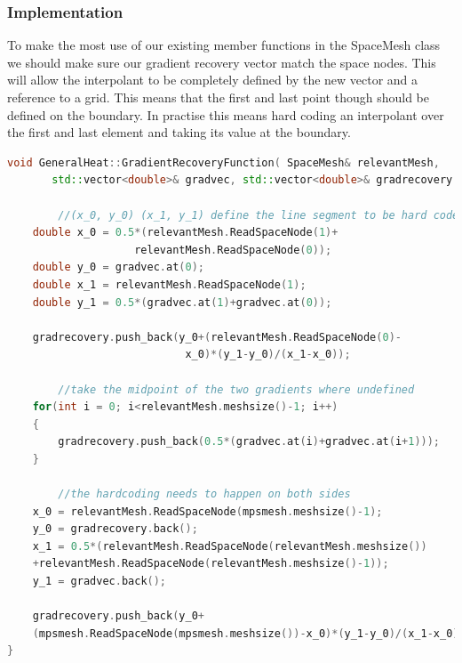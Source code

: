 \documentclass{uonmathreport}
\theoremstyle{definition}
\theoremstyle{problem}
\theoremstyle{theorem}
\begin{document}
\begin{center}
\end{center}

\subsubsection{Implementation} \label{subsubsec:KK Implementation}

To make the most use of our existing member functions in the SpaceMesh class we should make sure our gradient recovery vector match the space nodes. This will allow the interpolant to be completely defined by the new vector and a reference to a grid. This means that the first and last point though should be defined on the boundary. In practise this means hard coding an interpolant over the first and last element and taking its value at the boundary.

\begin{lstlisting}[language=C++]
void GeneralHeat::GradientRecoveryFunction( SpaceMesh& relevantMesh,
       std::vector<double>& gradvec, std::vector<double>& gradrecovery ) {
    	
    	//(x_0, y_0) (x_1, y_1) define the line segment to be hard coded
    double x_0 = 0.5*(relevantMesh.ReadSpaceNode(1)+
    				relevantMesh.ReadSpaceNode(0));
    double y_0 = gradvec.at(0);
    double x_1 = relevantMesh.ReadSpaceNode(1);
    double y_1 = 0.5*(gradvec.at(1)+gradvec.at(0));

    gradrecovery.push_back(y_0+(relevantMesh.ReadSpaceNode(0)-
    						x_0)*(y_1-y_0)/(x_1-x_0));
		
		//take the midpoint of the two gradients where undefined
    for(int i = 0; i<relevantMesh.meshsize()-1; i++)
    {
        gradrecovery.push_back(0.5*(gradvec.at(i)+gradvec.at(i+1)));
    }
		
		//the hardcoding needs to happen on both sides
    x_0 = relevantMesh.ReadSpaceNode(mpsmesh.meshsize()-1);
    y_0 = gradrecovery.back();
    x_1 = 0.5*(relevantMesh.ReadSpaceNode(relevantMesh.meshsize())			   
    +relevantMesh.ReadSpaceNode(relevantMesh.meshsize()-1));
    y_1 = gradvec.back();

    gradrecovery.push_back(y_0+
    (mpsmesh.ReadSpaceNode(mpsmesh.meshsize())-x_0)*(y_1-y_0)/(x_1-x_0));
}

\end{lstlisting}
\end{document}
